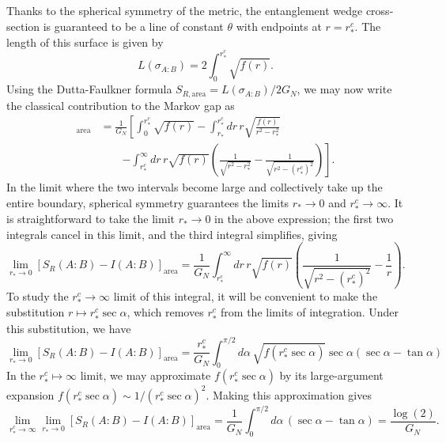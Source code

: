 \documentclass[a4paper,11pt]{article}
\begin{document}
Thanks to the spherical symmetry of the metric, the entanglement wedge cross-section is guaranteed to be a line of constant $\theta$ with endpoints at $r = r_*^c$. The length of this surface is given by
\begin{equation}
    L(\sigma_{A:B}) = 2 \int_{0}^{r_*^c} \sqrt{f(r)}.
\end{equation}
Using the Dutta-Faulkner formula $S_{R,\text{area}} = L(\sigma_{A:B}) / 2 G_N$, we may now write the classical contribution to the Markov gap as
\begin{align}
    [S_R(A:B) - I(A:B)]_{\text{area}}
        & = \frac{1}{G_N} \left[ \int_{0}^{r_*^c} \sqrt{f(r)}
            - \int_{r_*}^{r_*^c} dr\, r \sqrt{\frac{f(r)}{r^2 - r_*^2}} \right. \nonumber \\
            & \qquad \left. - \int_{r_*^c}^{\infty} dr\, r \sqrt{f(r)} \left( \frac{1}{\sqrt{r^2 - r_*^2}}  - \frac{1}{\sqrt{r^2 - (r_*^c)^2}}  \right)
        \right].
\end{align}
In the limit where the two intervals become large and collectively take up the entire boundary, spherical symmetry guarantees the limits $r_* \rightarrow 0$ and $r_*^c \rightarrow \infty$. It is straightforward to take the limit $r_* \rightarrow 0$ in the above expression; the first two integrals cancel in this limit, and the third integral simplifies, giving
\begin{equation}
    \lim_{r_* \rightarrow 0} [S_R(A:B) - I(A:B)]_{\text{area}}
        = \frac{1}{G_N} \int_{r_*^c}^{\infty} dr\, r \sqrt{f(r)} \left( \frac{1}{\sqrt{r^2 - (r_*^c)^2}} - \frac{1}{r}  \right).
\end{equation}
To study the $r_*^c \rightarrow \infty$ limit of this integral, it will be convenient to make the substitution $r \mapsto r_*^c \sec{\alpha}$, which removes $r_*^c$ from the limits of integration. Under this substitution, we have
\begin{equation}
    \lim_{r_* \rightarrow 0} [S_R(A:B) - I(A:B)]_{\text{area}}
        = \frac{r_*^c}{G_N} \int_{0}^{\pi/2} d\alpha\, \sqrt{f(r_*^c \sec{\alpha})} \sec{\alpha} (\sec{\alpha} - \tan{\alpha})
\end{equation}
In the $r_*^c \mapsto \infty$ limit, we may approximate $f(r_*^c \sec{\alpha})$ by its large-argument expansion $f(r_*^c \sec{\alpha}) \sim 1/(r_*^c \sec{\alpha})^2$. Making this approximation gives 
\begin{equation}
    \lim_{r_*^c \rightarrow \infty} \lim_{r_* \rightarrow 0} [S_R(A:B) - I(A:B)]_{\text{area}}
        = \frac{1}{G_N} \int_{0}^{\pi/2} d\alpha\, (\sec{\alpha} - \tan{\alpha})
        = \frac{\log(2)}{G_N}.
\end{equation}
\end{document}
